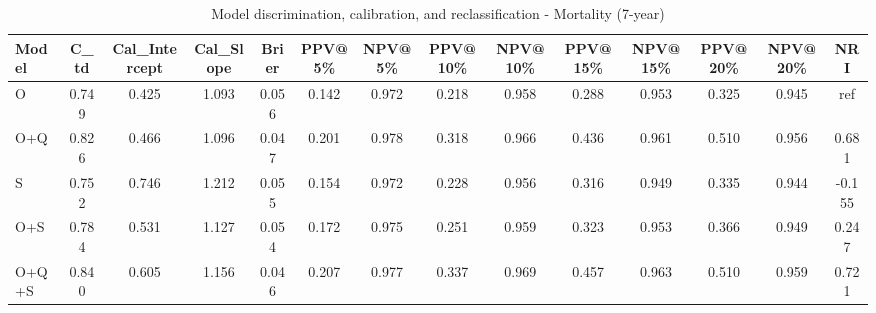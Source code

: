 \begin{table}[htbp]
\centering
\small
\caption{Model discrimination, calibration, and reclassification - Mortality (7-year)}
\label{tab:perf_mortality_7y}
\begin{tabular}{lccccccccccccc}
\toprule
Model & C\_td & Cal\_Intercept & Cal\_Slope & Brier & PPV@5\% & NPV@5\% & PPV@10\% & NPV@10\% & PPV@15\% & NPV@15\% & PPV@20\% & NPV@20\% & NRI \\
\midrule
O & 0.749 & 0.425 & 1.093 & 0.056 & 0.142 & 0.972 & 0.218 & 0.958 & 0.288 & 0.953 & 0.325 & 0.945 & ref \\
O+Q & 0.826 & 0.466 & 1.096 & 0.047 & 0.201 & 0.978 & 0.318 & 0.966 & 0.436 & 0.961 & 0.510 & 0.956 & 0.681 \\
S & 0.752 & 0.746 & 1.212 & 0.055 & 0.154 & 0.972 & 0.228 & 0.956 & 0.316 & 0.949 & 0.335 & 0.944 & -0.155 \\
O+S & 0.784 & 0.531 & 1.127 & 0.054 & 0.172 & 0.975 & 0.251 & 0.959 & 0.323 & 0.953 & 0.366 & 0.949 & 0.247 \\
O+Q+S & 0.840 & 0.605 & 1.156 & 0.046 & 0.207 & 0.977 & 0.337 & 0.969 & 0.457 & 0.963 & 0.510 & 0.959 & 0.721 \\
\bottomrule
\end{tabular}
\end{table}